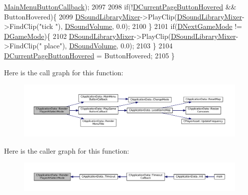 \begin{DoxyCode}
      \hyperlink{classCApplicationData_a4410839118b5b74dab798ad7be6f703b}{MainMenuButtonCallback});
2097     
2098     \textcolor{keywordflow}{if}(!\hyperlink{classCApplicationData_a96b3a9b5c9965540007dff3fa85587fa}{DCurrentPageButtonHovered} && ButtonHovered)\{
2099         \hyperlink{classCApplicationData_aa1e6876121bb4fb229ec6b930a8a6766}{DSoundLibraryMixer}->PlayClip(\hyperlink{classCApplicationData_aa1e6876121bb4fb229ec6b930a8a6766}{DSoundLibraryMixer}->FindClip(\textcolor{stringliteral}{"tick
      "}), \hyperlink{classCApplicationData_aa6e540f860dcb1929ef36ddce3be3691}{DSoundVolume}, 0.0);
2100     \}
2101     \textcolor{keywordflow}{if}(\hyperlink{classCApplicationData_a3b67edeacd70201dcf96fa9fa8aa2107}{DNextGameMode} != \hyperlink{classCApplicationData_a2f906f2b4208ecb2a057e6b62e549685}{DGameMode})\{
2102         \hyperlink{classCApplicationData_aa1e6876121bb4fb229ec6b930a8a6766}{DSoundLibraryMixer}->PlayClip(\hyperlink{classCApplicationData_aa1e6876121bb4fb229ec6b930a8a6766}{DSoundLibraryMixer}->FindClip(\textcolor{stringliteral}{"
      place"}), \hyperlink{classCApplicationData_aa6e540f860dcb1929ef36ddce3be3691}{DSoundVolume}, 0.0);
2103     \}
2104     \hyperlink{classCApplicationData_a96b3a9b5c9965540007dff3fa85587fa}{DCurrentPageButtonHovered} = ButtonHovered;
2105 \}
\end{DoxyCode}
Here is the call graph for this function\+:\nopagebreak
\begin{figure}[H]
\begin{center}
\leavevmode
\includegraphics[width=350pt]{classCApplicationData_a7d46646402ac95a056456e4a3bb353ed_cgraph}
\end{center}
\end{figure}
Here is the caller graph for this function\+:\nopagebreak
\begin{figure}[H]
\begin{center}
\leavevmode
\includegraphics[width=350pt]{classCApplicationData_a7d46646402ac95a056456e4a3bb353ed_icgraph}
\end{center}
\end{figure}
\hypertarget{classCApplicationData_a18ae4aed31d9ef2416059e66babb05b0}{}\label{classCApplicationData_a18ae4aed31d9ef2416059e66babb05b0} 
